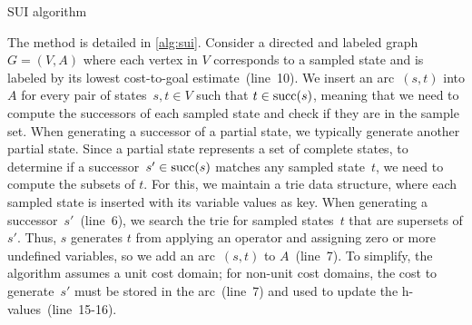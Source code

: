 \begin{algorithm}[ht]
    \caption{SUI algorithm}
    \label{alg:sui}

    \SetAlgoLined


\end{algorithm}

The method is detailed in \cref{alg:sui}. Consider a directed and labeled graph~$G=(V,A)$ where each vertex in $V$ corresponds to a sampled state and is labeled by its lowest cost-to-goal estimate~(line~10). We insert an arc~$(s,t)$ into $A$ for every pair of states~$s,t \in V$ such that $t \in \operatorname{succ}(s)$, meaning that we need to compute the successors of each sampled state and check if they are in the sample set. When generating a successor of a partial state, we typically generate another partial state. Since a partial state represents a set of complete states, to determine if a successor~$s' \in \operatorname{succ}(s)$ matches any sampled state~$t$, we need to compute the subsets of $t$. For this, we maintain a trie data structure, where each sampled state is inserted with its variable values as key. When generating a successor~$s'$~(line~6), we search the trie for sampled states~$t$ that are supersets of $s'$. Thus, $s$ generates $t$ from applying an operator and assigning zero or more undefined variables, so we add an arc~$(s,t)$ to $A$~(line~7). To simplify, the algorithm assumes a unit cost domain; for non-unit cost domains, the cost to generate~$s'$ must be stored in the arc~(line~7) and used to update the h-values~(line~15-16).


